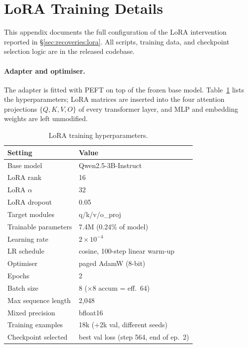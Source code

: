 \documentclass[11pt]{article}
\begin{document}
\section{LoRA Training Details}
\label{app:lora}

This appendix documents the full configuration of the LoRA
intervention reported in \S\ref{sec:recoveries:lora}.
All scripts, training data, and checkpoint selection logic are in
the released codebase.

\paragraph{Adapter and optimiser.}
The adapter is fitted with PEFT \citep{hu2021lora} on top of the
frozen base model.
Table~\ref{tab:lora_hparams} lists the hyperparameters; LoRA matrices
are inserted into the four attention projections $\{Q, K, V, O\}$ of
every transformer layer, and MLP and embedding weights are left
unmodified.

\begin{table}[!htbp]
\centering
\footnotesize
\setlength{\tabcolsep}{4pt}
\begin{tabular}{ll}
\toprule
\textbf{Setting} & \textbf{Value} \\
\midrule
Base model           & Qwen2.5-3B-Instruct \\
LoRA rank            & 16 \\
LoRA $\alpha$        & 32 \\
LoRA dropout         & 0.05 \\
Target modules       & q/k/v/o\_proj \\
Trainable parameters & 7.4M (0.24\% of model) \\
\midrule
Learning rate        & $2 \times 10^{-4}$ \\
LR schedule          & cosine, 100-step linear warm-up \\
Optimiser            & paged AdamW (8-bit) \\
Epochs               & 2 \\
Batch size           & 8 ($\times$8 accum = eff.\ 64) \\
Max sequence length  & 2{,}048 \\
Mixed precision      & bfloat16 \\
\midrule
Training examples    & 18k (+2k val, different seeds) \\
Checkpoint selected  & best val loss (step 564, end of ep.\ 2) \\
\bottomrule
\end{tabular}
\caption{LoRA training hyperparameters.}
\label{tab:lora_hparams}
\end{table}
\end{document}
